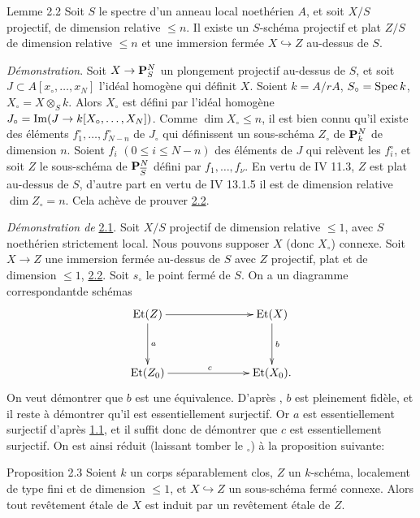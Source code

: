\documentclass[10pt]{../fichiers-configuration-latex/smfart}
\begin{document}
\begin{enonce*}{Lemme 2.2}
Soit $S$ le spectre d'un anneau local noethérien $A$, et soit $X/S$
projectif, de dimension relative $\leq n$. Il existe un $S$-schéma
projectif et plat $Z/S$ de dimension relative $\leq n$ et une
immersion fermée $X\hookrightarrow Z$ au-dessus de $S$.
\end{enonce*}

\noindent
\emph{Démonstration}. Soit $X\rightarrow \mathbf{P}^N_S$ un plongement
projectif au-dessus de $S$, et soit $J\subset A[x_{\circ},\ldots,x_N]$
l'idéal homogène qui définit $X$. Soient $k=A/rA$, $S_{\circ}=\operatorname{Spec}
k$, $X_{\circ}=X\otimes_S k$. Alors $X_{\circ}$ est défini par l'idéal
homogène $J_{\circ}=\operatorname{Im}(J\rightarrow k[X_{\circ},\dots,X_N])$. Comme
$\dim X_{\circ}\leq n$, il est bien connu qu'il existe des éléments
$f^{\circ}_1,\ldots,f^{\circ}_{N-n}$ de $J_{\circ}$ qui définissent un
sous-schéma $Z_{\circ}$ de $\mathbf{P}^N_k$ de dimension $n$. Soient
$f_i$ $(0 \leq i\leq N-n)$ des éléments de $J$ qui relèvent les
$f^{\circ}_i$, et soit $Z$ le sous-schéma de $\mathbf{P}^N_{\overline{S}}$
défini par $f_1,\ldots,f_{\nu}$. En vertu de \EGA IV 11.3, $Z$ est plat
au-dessus de $S$, d'autre part en vertu de \EGA IV 13.1.5 il est de
dimension relative $\dim Z_{\circ}=n$. Cela achève de prouver \hyperref[XIII.lem2.2]{2.2}.

\noindent
\emph{Démonstration de} \hyperref[XIII.prop2.1]{2.1}. Soit $X/S$ projectif de dimension
relative $\leq 1$, avec $S$ noethérien strictement local. Nous pouvons
supposer $X$ (donc $X_{\circ}$) connexe. Soit $X\rightarrow Z$ une
immersion fermée au-dessus de $S$ avec $Z$ projectif, plat et de
dimension $\leq 1$, \cf \hyperref[XIII.lem2.2]{2.2}. Soit $s_{\circ}$ le point fermé de
$S$. On a un diagramme correspondant\pageoriginale de schémas
$$
\xymatrix@C=2.5cm@R=1.25cm{
\Et(Z)  \ar[r] \ar[d]^{a}& \Et(X) \ar[d]^{b}                  \\
\Et(Z_0)  \ar[r]^{c} & \Et(X_{0}).
}
$$
On veut démontrer que $b$ est une équivalence. D'après , $b$
est pleinement fidèle, et il reste à démontrer qu'il est
essentiellement surjectif. Or $a$ est essentiellement surjectif d'après
\hyperref[XIII.prop1.1]{1.1}, et il suffit donc de démontrer que $c$ est essentiellement
surjectif. On est ainsi réduit (laissant tomber le ${}_{\circ}$) à la
proposition suivante:

\begin{enonce*}{Proposition 2.3}
Soient $k$ un corps séparablement clos, $Z$ un $k$-schéma, localement
de type fini et de dimension $\leq 1$, et $X\hookrightarrow Z$ un
sous-schéma fermé connexe. Alors tout revêtement étale de $X$ est
induit par un revêtement étale de $Z$.
\end{enonce*}
\end{document}
